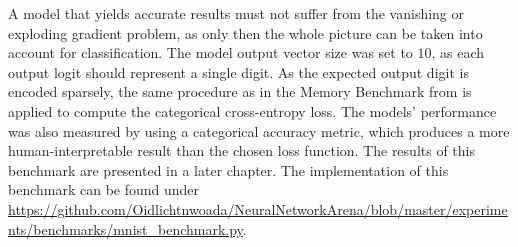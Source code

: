 \documentclass[draft,final]{vutinfth} %
\begin{document}
    A model that yields accurate results must not suffer from the vanishing or exploding gradient problem, as only then the whole picture can be taken into account for classification.
    The model output vector size was set to $10$, as each output logit should represent a single digit.
    As the expected output digit is encoded sparsely, the same procedure as in the Memory Benchmark from  is applied to compute the categorical cross-entropy loss.
    The models' performance was also measured by using a categorical accuracy metric, which produces a more human-interpretable result than the chosen loss function.
    The results of this benchmark are presented in a later chapter.
    The implementation of this benchmark can be found under \url{https://github.com/Oidlichtnwoada/NeuralNetworkArena/blob/master/experiments/benchmarks/mnist_benchmark.py}.
\end{document}
